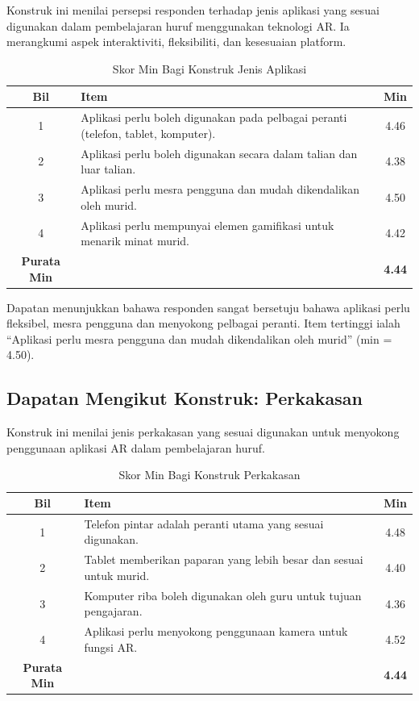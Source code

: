 {{Konstruk ini menilai persepsi responden terhadap jenis aplikasi yang sesuai digunakan dalam pembelajaran huruf menggunakan teknologi AR. Ia merangkumi aspek interaktiviti, fleksibiliti, dan kesesuaian platform.

\begin{table}[H]
\centering
\caption{Skor Min Bagi Konstruk Jenis Aplikasi}
\label{jadual:jenisAplikasi}
\begin{tabular}{|c|p{9cm}|c|}
\hline
\textbf{Bil} & \textbf{Item} & \textbf{Min} \\
\hline
1 & Aplikasi perlu boleh digunakan pada pelbagai peranti (telefon, tablet, komputer). & 4.46 \\
\hline
2 & Aplikasi perlu boleh digunakan secara dalam talian dan luar talian. & 4.38 \\
\hline
3 & Aplikasi perlu mesra pengguna dan mudah dikendalikan oleh murid. & 4.50 \\
\hline
4 & Aplikasi perlu mempunyai elemen gamifikasi untuk menarik minat murid. & 4.42 \\
\hline
\textbf{Purata Min} & & \textbf{4.44} \\
\hline
\end{tabular}
\end{table}

Dapatan menunjukkan bahawa responden sangat bersetuju bahawa aplikasi perlu fleksibel, mesra pengguna dan menyokong pelbagai peranti. Item tertinggi ialah “Aplikasi perlu mesra pengguna dan mudah dikendalikan oleh murid” (min = 4.50).
\subsection{Dapatan Mengikut Konstruk: Perkakasan}

Konstruk ini menilai jenis perkakasan yang sesuai digunakan untuk menyokong penggunaan aplikasi AR dalam pembelajaran huruf.

\begin{table}[H]
\centering
\caption{Skor Min Bagi Konstruk Perkakasan}
\label{jadual:perkakasan}
\begin{tabular}{|c|p{9cm}|c|}
\hline
\textbf{Bil} & \textbf{Item} & \textbf{Min} \\
\hline
1 & Telefon pintar adalah peranti utama yang sesuai digunakan. & 4.48 \\
\hline
2 & Tablet memberikan paparan yang lebih besar dan sesuai untuk murid. & 4.40 \\
\hline
3 & Komputer riba boleh digunakan oleh guru untuk tujuan pengajaran. & 4.36 \\
\hline
4 & Aplikasi perlu menyokong penggunaan kamera untuk fungsi AR. & 4.52 \\
\hline
\textbf{Purata Min} & & \textbf{4.44} \\
\hline
\end{tabular}
\end{table}

}}
